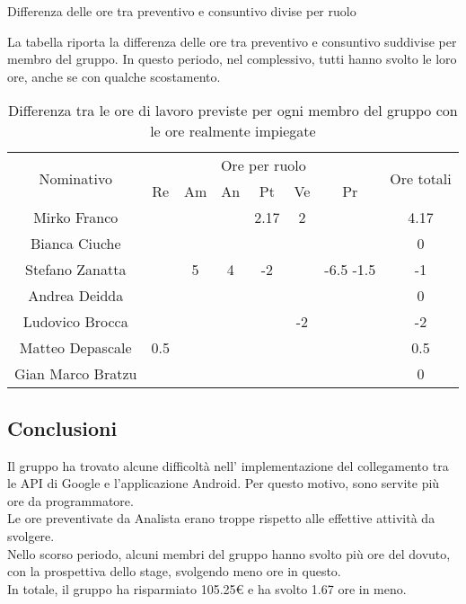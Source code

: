 \begin{flushleft}
\begin{table}[!h]
\begin{center}
			\caption{Differenza delle ore tra preventivo e consuntivo divise per ruolo} 
		\end{center}
	\end{table}

	La tabella riporta la differenza delle ore tra preventivo e consuntivo suddivise per membro del gruppo. In questo periodo, nel complessivo, tutti hanno svolto le loro ore, anche se con qualche scostamento. 
	
	\begin{table}[!h]
		\begin{center}
			\begin{tabularx}{\textwidth}{|c|cccccc|c|}
				
				\hline
				\multirow{2}{*}{Nominativo} & \multicolumn{6}{c|}{Ore per ruolo} & \multirow{2}{*}{Ore totali} \\ \cline{2-7}
				& Re & Am & An & Pt & Ve & Pr &      \\ \hline
				\endhead
				Mirko Franco       &   &  &   & 2.17   & 2 &  & 4.17        \\ \hline
				Bianca Ciuche      &   &   &  &    &  &  & 0        \\ \hline
				Stefano Zanatta    &   & 5 & 4    &	 -2  & & -6.5 -1.5 & -1        \\ \hline
				Andrea Deidda      &   &  &   &   &  &   & 0  		\\ \hline
				Ludovico Brocca    &   &  &   &    &  -2&  & -2        \\ \hline
				Matteo Depascale   &  0.5 & &  &  &  &    & 0.5  		\\ \hline
				Gian Marco Bratzu  & &  &   &   &  &   & 0        \\ \hline
				
			\end{tabularx}
			\caption{Differenza tra le ore di lavoro previste per ogni membro del gruppo con le ore realmente impiegate }
		\end{center}
	\end{table}

	\subsection{Conclusioni}
	Il gruppo ha trovato alcune difficoltà nell' implementazione del collegamento tra le API di Google e l'applicazione Android. Per questo motivo, sono servite più ore da programmatore.\\Le ore preventivate da Analista erano troppe rispetto alle effettive attività da svolgere.\\
	Nello scorso periodo, alcuni membri del gruppo hanno svolto più ore del dovuto, con la prospettiva dello stage, svolgendo meno ore in questo.\\
	In totale, il gruppo ha risparmiato 105.25{\euro} e ha svolto 1.67 ore in meno.


\end{flushleft}
